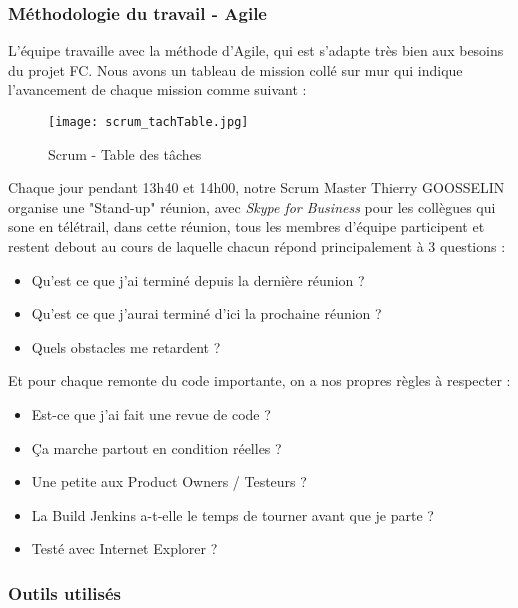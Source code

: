     \subsubsection{Méthodologie du travail - Agile}
    L'équipe travaille avec la méthode d'Agile, qui est s'adapte très bien aux besoins du projet FC. Nous avons un tableau de mission collé sur mur qui indique l'avancement de chaque mission comme suivant : 
    \begin{figure}[H]
        \centering
        \texttt{[image: scrum\_tachTable.jpg]}
        \caption{Scrum - Table des tâches}
        \label{fig:scrum_figure}
    \end{figure}
    \par Chaque jour pendant 13h40 et 14h00, notre Scrum Master Thierry GOOSSELIN organise une "Stand-up" réunion, avec \textit{Skype for Business} pour les collègues qui sone en télétrail, dans cette réunion, tous les membres d'équipe participent et restent debout au cours de laquelle chacun répond principalement à 3 questions : 
    \begin{itemize}[label=\textbullet]
        \item Qu'est ce que j'ai terminé depuis la dernière réunion ?
        \item Qu'est ce que j'aurai terminé d'ici la prochaine réunion ?
        \item Quels obstacles me retardent ?
    \end{itemize}
    
    \par Et pour chaque remonte du code importante, on a nos propres règles à respecter : 
    \begin{itemize}[label=\textbullet]
        \item Est-ce que j'ai fait une revue de code ?
        \item Ça marche partout en condition réelles ?
        \item Une petite aux Product Owners / Testeurs ?
        \item La Build Jenkins a-t-elle le temps de tourner avant que je parte ?
        \item Testé avec Internet Explorer ?
    \end{itemize}

    \subsubsection{Outils utilisés}
